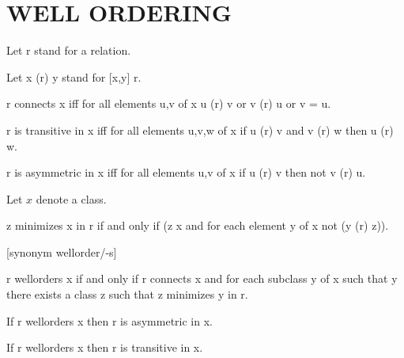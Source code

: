 \documentclass[a4paper,draft]{amsproc}
\begin{document}
\section{WELL ORDERING}
\begin{forthel}

Let r stand for a relation.

Let x (r) y stand for [x,y] \in r.

\begin{definition}[82]
r connects x iff for all elements u,v of x u (r) v or v (r) u or v = u.
\end{definition}

\begin{definition}[83]
r is transitive in x iff for all elements u,v,w of x if u (r) v and v (r) w then u (r) w.
\end{definition}

\begin{definition}[84]
r is asymmetric in x iff for all elements u,v of x if u (r) v then not v (r) u.
\end{definition}


Let $x$ denote a class.
\begin{definition}[86]
z minimizes x in r if and only if (z \in x and for each element y of x not (y (r) z)).
\end{definition}

[synonym wellorder/-s]
\begin{definition}[87]
r wellorders x if and only if r connects x and for each subclass y of x such that y 
there exists a class z such that z minimizes y in r.
\end{definition}

\begin{theorem}[88a]
If r wellorders x then r is asymmetric in x.
\end{theorem}

\begin{theorem}[88b]
If r wellorders x then r is transitive in x.
\end{theorem}


\end{forthel}
\end{document}
